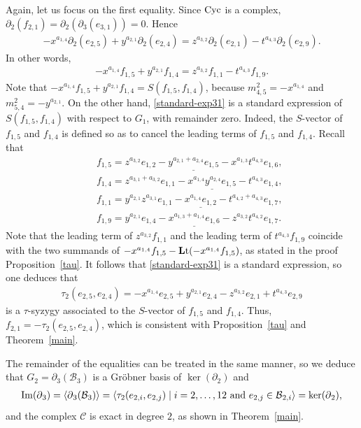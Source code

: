 \documentclass[ALCO]{cedram}
\newcommand{\lt}{\mbox{${\bf L}{\rm t}$}}
\newcommand{\mcb}{\mbox{$\mathcal{B}$}}
\newcommand{\mcc}{\mbox{$\mathcal{C}$}}
\newcommand{\dif}{\mbox{$\partial$}}
\newcommand{\cyc}{\mbox{${\rm Cyc}$}}
\begin{document}
Again, let us focus on the first equality. Since $\cyc$ is a complex,
$\dif_2(f_{2,1})=\dif_2(\dif_3(e_{3,1}))=0$. Hence
\begin{eqnarray*}
-x^{a_{1,4}}\dif_{2}(e_{2,5})+y^{a_{2,1}}\dif_{2}(e_{2,4})=
z^{a_{3,2}}\dif_2(e_{2,1})-t^{a_{4,3}}\dif_2(e_{2,9}).
\end{eqnarray*}
In other words, 
\begin{eqnarray}\label{standard-exp31}
-x^{a_{1,4}}f_{1,5}+y^{a_{2,1}}f_{1,4}=z^{a_{3,2}}f_{1,1}-t^{a_{4,3}}f_{1,9}.
\end{eqnarray}
Note that $-x^{a_{1,4}}f_{1,5}+y^{a_{2,1}}f_{1,4}=S(f_{1,5},f_{1,4})$,
because $m^2_{4,5}=-x^{a_{1,4}}$ and $m^2_{5,4}=-y^{a_{2,1}}$. On the
other hand, \eqref{standard-exp31} is a standard expression of
$S(f_{1,5},f_{1,4})$ with respect to $G_1$, with remainder
zero. Indeed, the $S$-vector of $f_{1,5}$ and $f_{1,4}$ is defined so
as to cancel the leading terms of $f_{1,5}$ and $f_{1,4}$. Recall that
\begin{eqnarray*}
&&f_{1,5}=z^{a_{3,2}}e_{1,2}-\underline{y^{a_{2,1}+a_{2,4}}e_{1,5}}-
x^{a_{1,3}}t^{a_{4,3}}e_{1,6},\\
&&f_{1,4}=z^{a_{3,1}+a_{3,2}}e_{1,1}-\underline{x^{a_{1,4}}y^{a_{2,4}}e_{1,5}}-
t^{a_{4,3}}e_{1,4},\\
&&f_{1,1}=y^{a_{2,1}}z^{a_{3,1}}e_{1,1}-\underline{x^{a_{1,4}}e_{1,2}}-
t^{a_{4,2}+a_{4,3}}e_{1,7},\\
&&f_{1,9}=y^{a_{2,1}}e_{1,4}-\underline{x^{a_{1,3}+a_{1,4}}e_{1,6}}-
z^{a_{3,2}}t^{a_{4,2}}e_{1,7}.
\end{eqnarray*}
Note that the leading term of $z^{a_{3,2}}f_{1,1}$ and the leading
term of $t^{a_{4,3}}f_{1,9}$ coincide with the two summands of
$-x^{a_{1,4}}f_{1,5}-\lt(-x^{a_{1,4}}f_{1,5})$, as stated in the proof
Proposition~\ref{tau}. It follows that \eqref{standard-exp31} is a
standard expression, so one deduces that
\begin{eqnarray*}
\tau_2(e_{2,5},e_{2,4})=-x^{a_{1,4}}e_{2,5}+y^{a_{2,1}}e_{2,4}-z^{a_{3,2}}e_{2,1}
+t^{a_{4,3}}e_{2,9}
\end{eqnarray*}
is a $\tau$-syzygy associated to the $S$-vector of $f_{1,5}$ and
$f_{1,4}$. Thus, $f_{2,1}=-\tau_2(e_{2,5},e_{2,4})$, which is
consistent with Proposition~\ref{tau} and Theorem~\ref{main}. 

The remainder of the equalities can be treated in the same manner, so
we deduce that $G_2=\dif_3(\mcb_3)$ is a Gr\"obner basis of
$\ker(\dif_2)$ and
\begin{eqnarray*}
{\rm Im}(\dif_3)=\langle\dif_{3}(\mcb_{3})\rangle=\langle
\tau_2(e_{2,i},e_{2,j})\mid i=2,\ldots ,12\mbox{ and
  }e_{2,j}\in\mcb_{2,i} \rangle=\ker(\dif_{2}),
\end{eqnarray*}
and the complex $\mcc$ is exact in degree $2$, as shown in
Theorem~\ref{main}.
\end{document}
